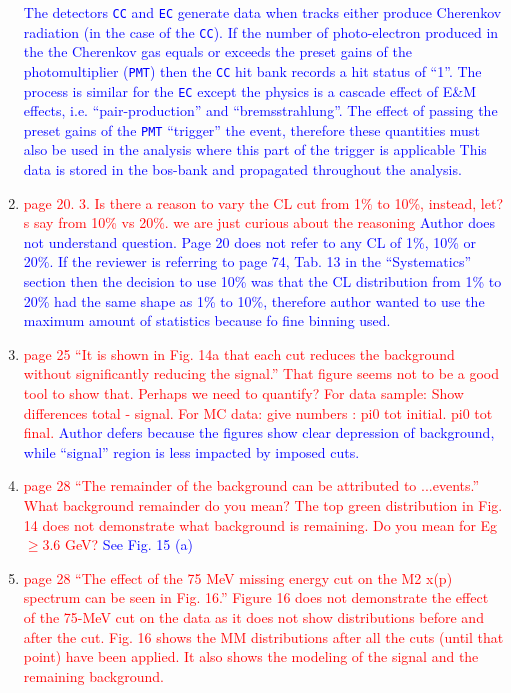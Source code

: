 \documentclass[11pt,a4paper]{article}
\newcommand{\abbr}[1]{\textsc{\texttt{#1}}}
\begin{document}
\begin{enumerate}
\textcolor{blue}{The detectors \abbr{CC} and \abbr{EC} generate data when tracks either produce Cherenkov radiation (in the case of the \abbr{CC}). If the number of photo-electron produced in the the Cherenkov gas equals or exceeds the preset gains of the photomultiplier (\abbr{PMT}) then the \abbr{CC} hit bank records a hit status of ``1''. The process is similar for the \abbr{EC} except the physics is a cascade effect of E\&M effects, i.e. ``pair-production'' and ``bremsstrahlung''. The effect of passing the preset gains of the \abbr{PMT} ``trigger'' the event, therefore these quantities must also be used in the analysis where this part of the trigger is applicable This data is stored in the bos-bank and propagated throughout the analysis.}
\item
\textcolor{red}{page 20. 3. Is there a reason to vary the CL cut from 1\% to 10\%, instead, let?s say from 10\% vs 20\%. we are just curious about the reasoning}
\textcolor{blue}{Author does not understand question. Page 20 does not refer to any CL of 1\%, 10\% or 20\%. If the reviewer is referring to page 74, Tab. 13 in the ``Systematics'' section then the decision to use 10\% was that the CL distribution from 1\% to 20\% had the same shape as 1\% to 10\%, therefore author wanted to use the maximum amount of statistics because fo fine binning used.  }
\item
\textcolor{red}{page 25 ``It is shown in Fig. 14a that each cut reduces the background
without significantly reducing the signal.'' That figure seems not to be a good tool to show that. Perhaps we need to quantify? For data sample: Show differences total - signal. For MC data: give numbers : pi0 tot initial. pi0 tot final.}
\textcolor{blue}{Author defers because the figures show clear depression of background, while ``signal'' region is less impacted by imposed cuts.}
\item
\textcolor{red}{ page 28 ``The remainder of the background can be attributed to ...events.'' What background remainder do you mean? The top green distribution in Fig. 14 does not demonstrate what background is remaining. Do you mean for Eg$\geq$3.6 GeV?}
\textcolor{blue}{See Fig. 15 (a)}
\item
\textcolor{red}{page 28 ``The effect of the 75 MeV missing energy cut on the M2
x(p) spectrum can be seen in Fig. 16.'' Figure 16 does not demonstrate the effect of the 75-MeV cut on the data as it does not show distributions before and after the cut. Fig. 16 shows the MM distributions after all the cuts (until that point) have been applied. It also shows the modeling of the signal and the remaining background.}

\end{enumerate}
\end{document}
